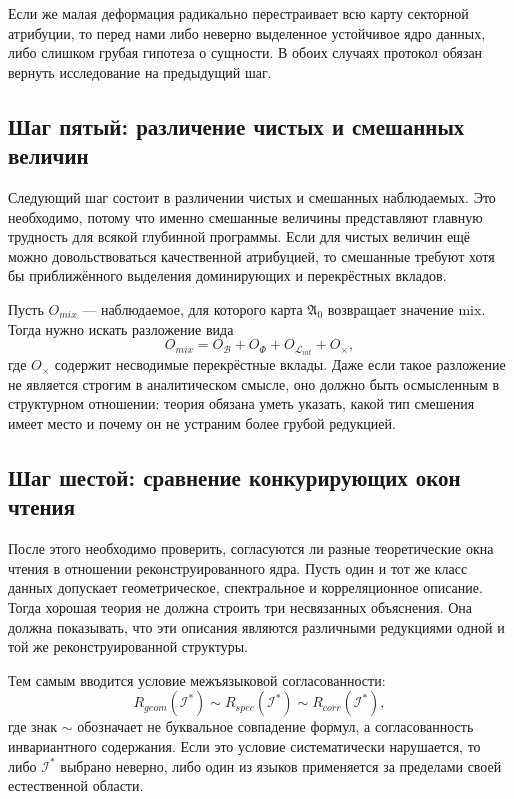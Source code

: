 \documentclass[12pt,a4paper]{article}
\begin{document}
Если же малая деформация радикально перестраивает всю карту секторной атрибуции, то перед нами либо неверно выделенное устойчивое ядро данных, либо слишком грубая гипотеза о сущности. В обоих случаях протокол обязан вернуть исследование на предыдущий шаг.

\subsection{Шаг пятый: различение чистых и смешанных величин}

Следующий шаг состоит в различении чистых и смешанных наблюдаемых. Это необходимо, потому что именно смешанные величины представляют главную трудность для всякой глубинной программы. Если для чистых величин ещё можно довольствоваться качественной атрибуцией, то смешанные требуют хотя бы приближённого выделения доминирующих и перекрёстных вкладов.

Пусть \(O_{mix}\) --- наблюдаемое, для которого карта \(\mathfrak{A}_0\) возвращает значение \(\mathrm{mix}\). Тогда нужно искать разложение вида
\begin{equation}
O_{mix} = O_{\mathcal{B}} + O_{\Phi} + O_{\mathcal{L}_{int}} + O_{\times},
\end{equation}
где \(O_{\times}\) содержит несводимые перекрёстные вклады. Даже если такое разложение не является строгим в аналитическом смысле, оно должно быть осмысленным в структурном отношении: теория обязана уметь указать, какой тип смешения имеет место и почему он не устраним более грубой редукцией.

\subsection{Шаг шестой: сравнение конкурирующих окон чтения}

После этого необходимо проверить, согласуются ли разные теоретические окна чтения в отношении реконструированного ядра. Пусть один и тот же класс данных допускает геометрическое, спектральное и корреляционное описание. Тогда хорошая теория не должна строить три несвязанных объяснения. Она должна показывать, что эти описания являются различными редукциями одной и той же реконструированной структуры.

Тем самым вводится условие межъязыковой согласованности:
\begin{equation}
R_{geom}(\mathcal{I}^*) \sim R_{spec}(\mathcal{I}^*) \sim R_{corr}(\mathcal{I}^*),
\end{equation}
где знак \(\sim\) обозначает не буквальное совпадение формул, а согласованность инвариантного содержания. Если это условие систематически нарушается, то либо \(\mathcal{I}^*\) выбрано неверно, либо один из языков применяется за пределами своей естественной области.
\end{document}
